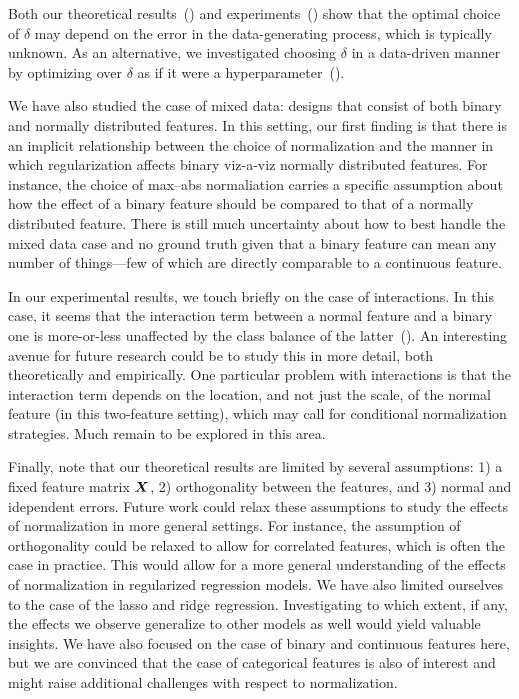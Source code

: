 Both our theoretical results~() and experiments~() show that the optimal choice of \(\delta\) may depend on the error in the data-generating process, which is typically unknown. As an alternative, we investigated choosing \(\delta\) in a data-driven manner by optimizing over \(\delta\) as if it were a  hyperparameter~().

We have also studied the case of mixed data: designs that consist of both binary and normally distributed features. In this setting, our first finding is that there is an implicit relationship between the choice of normalization and the manner in which regularization affects binary viz-a-viz normally distributed features. For instance, the choice of max--abs normaliation carries a specific assumption about how the effect of a binary feature should be compared to that of a normally distributed feature. There is still much uncertainty about how to best handle the mixed data case and no ground truth given that a binary feature can mean any number of things---few of which are directly comparable to a continuous feature.

In our experimental results, we touch briefly on the case of interactions. In this case, it seems that the interaction term between a normal feature and a binary one is more-or-less unaffected by the class balance of the latter~(). An interesting avenue for future research could be to study this in more detail, both theoretically and empirically. One particular problem with interactions is
that the interaction term depends on the location, and not just the scale, of the normal feature (in this two-feature setting), which may call for conditional normalization strategies. Much remain to be explored in this area.

Finally, note that our theoretical results are limited by several assumptions: 1) a fixed feature matrix \(\boldsymbol{X}\), 2) orthogonality between the features, and 3) normal and idependent errors. Future work could relax these assumptions to study the effects of normalization in more general settings. For instance, the assumption of orthogonality could be relaxed to allow for correlated features, which is often the case in practice. This would allow for a more general understanding of the effects of normalization in regularized regression models. We have also limited ourselves to the case of the lasso and ridge regression. Investigating to which extent, if any, the effects we observe generalize to other models as well would yield valuable insights. We have also focused on the case of binary and continuous features here, but we are convinced that the case of categorical features is also of interest and might raise additional challenges with respect to normalization.
